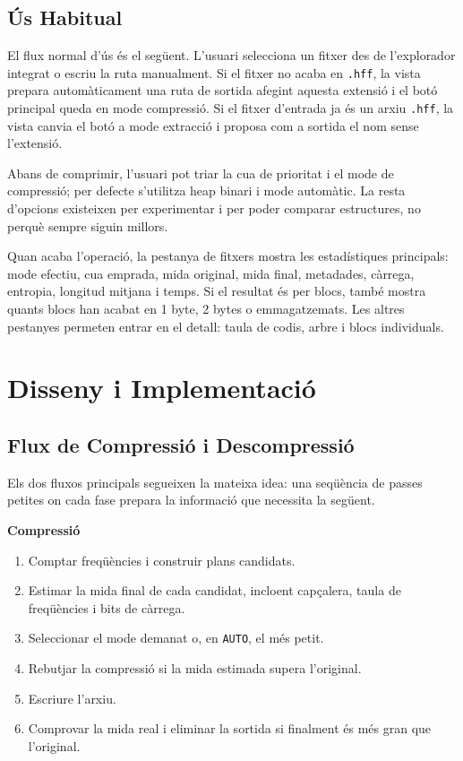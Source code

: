 \documentclass[conference,compsoc]{IEEEtran}
\begin{document}
\subsection{Ús Habitual}

El flux normal d'ús és el següent. L'usuari selecciona un fitxer des de
l'explorador integrat o escriu la ruta manualment. Si el fitxer no acaba
en \texttt{.hff}, la vista prepara automàticament una ruta de sortida
afegint aquesta extensió i el botó principal queda en mode compressió. Si
el fitxer d'entrada ja és un arxiu \texttt{.hff}, la vista canvia el botó
a mode extracció i proposa com a sortida el nom sense l'extensió.

Abans de comprimir, l'usuari pot triar la cua de prioritat i el mode de
compressió; per defecte s'utilitza heap binari i mode automàtic.
La resta d'opcions existeixen per experimentar i per poder
comparar estructures, no perquè sempre siguin millors.

Quan acaba l'operació, la pestanya de fitxers mostra les estadístiques
principals: mode efectiu, cua emprada, mida original, mida final,
metadades, càrrega, entropia, longitud mitjana i temps. Si el resultat és
per blocs, també mostra quants blocs han acabat en 1 byte, 2 bytes o
emmagatzemats. Les altres pestanyes permeten entrar en el detall: taula de
codis, arbre i blocs individuals.

\section{Disseny i Implementació}

\subsection{Flux de Compressió i Descompressió}

Els dos fluxos principals segueixen la mateixa idea: una seqüència de
passes petites on cada fase prepara la informació que necessita la
següent.

\textbf{Compressió}

\begin{enumerate}
    \item Comptar freqüències i construir plans candidats.
    \item Estimar la mida final de cada candidat, incloent capçalera,
          taula de freqüències i bits de càrrega.
    \item Seleccionar el mode demanat o, en \texttt{AUTO}, el més petit.
    \item Rebutjar la compressió si la mida estimada supera l'original.
    \item Escriure l'arxiu.
    \item Comprovar la mida real i eliminar la sortida si finalment és
          més gran que l'original.
\end{enumerate}
\end{document}
